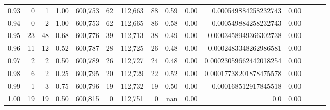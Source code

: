 \begin{tabular}{rrrrrrrrrrrrrrr}
0.93 &       0 &      1 &  1.00 &  600,753 &       62 &  112,663 &       88 &  0.59 &  0.00 &    0.000549884258232743 &      0.00 \\
0.94 &       0 &      2 &  1.00 &  600,753 &       62 &  112,665 &       86 &  0.58 &  0.00 &    0.000549884258232743 &      0.00 \\
0.95 &      23 &     48 &  0.68 &  600,776 &       39 &  112,713 &       38 &  0.49 &  0.00 &   0.0003458949366302738 &      0.00 \\
0.96 &      11 &     12 &  0.52 &  600,787 &       28 &  112,725 &       26 &  0.48 &  0.00 &   0.0002483348262986581 &      0.00 \\
0.97 &       2 &      2 &  0.50 &  600,789 &       26 &  112,727 &       24 &  0.48 &  0.00 &  0.00023059662442018254 &      0.00 \\
0.98 &       6 &      2 &  0.25 &  600,795 &       20 &  112,729 &       22 &  0.52 &  0.00 &  0.00017738201878475578 &      0.00 \\
0.99 &       1 &      3 &  0.75 &  600,796 &       19 &  112,732 &       19 &  0.50 &  0.00 &    0.000168512917845518 &      0.00 \\
1.00 &      19 &     19 &  0.50 &  600,815 &        0 &  112,751 &        0 &   nan &  0.00 &                     0.0 &      0.00 \\
\bottomrule
\end{tabular}
